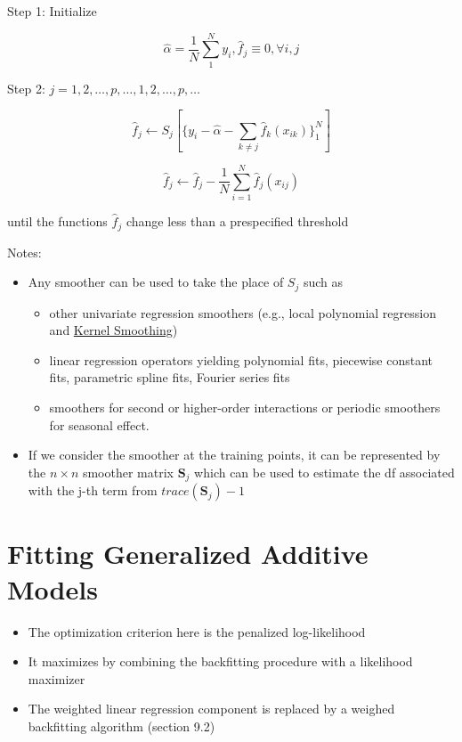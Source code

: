 \documentclass[
]{book}
\begin{document}
Step 1: Initialize

\[
\hat{\alpha} = \frac{1}{N}\sum_{1}^N y_i, \hat{f}_j \equiv 0, \forall i, j
\]

Step 2: \(j = 1,2, \dots, p, \dots, 1, 2, \dots, p, \dots\)

\[
\hat{f}_j \leftarrow S_j [\{ y_i - \hat{\alpha}- \sum_{k \neq j} \hat{f}_k (x_{ik})\}^N_1]
\]

\[
\hat{f}_j \leftarrow \hat{f}_j - \frac{1}{N} \sum_{i=1}^N \hat{f}_j (x_{ij})
\]

until the functions \(\hat{f}_j\) change less than a prespecified threshold

Notes:

\begin{itemize}
\item
  Any smoother can be used to take the place of \(S_j\) such as

  \begin{itemize}
  \item
    other univariate regression smoothers (e.g., local polynomial regression and \protect\hyperlink{kernel-smoothing}{Kernel Smoothing})
  \item
    linear regression operators yielding polynomial fits, piecewise constant fits, parametric spline fits, Fourier series fits
  \item
    smoothers for second or higher-order interactions or periodic smoothers for seasonal effect.
  \end{itemize}
\item
  If we consider the smoother at the training points, it can be represented by the \(n \times n\) smoother matrix \(\mathbf{S}_j\) which can be used to estimate the df associated with the j-th term from \(trace(\mathbf{S}_j) -1\)
\end{itemize}

\hypertarget{fitting-generalized-additive-models}{%
\section{Fitting Generalized Additive Models}\label{fitting-generalized-additive-models}}

\begin{itemize}
\item
  The optimization criterion here is the penalized log-likelihood
\item
  It maximizes by combining the backfitting procedure with a likelihood maximizer
\item
  The weighted linear regression component is replaced by a weighed backfitting algorithm \citet{hastie2001a} (section 9.2)
\end{itemize}
\end{document}
